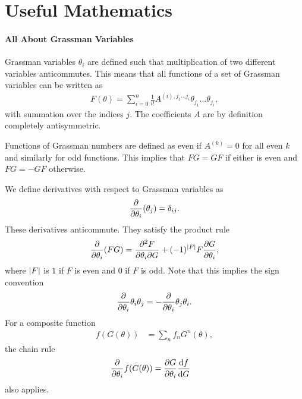 \section{Useful Mathematics}

\paragraph{All About Grassman Variables}
Grassman variables $\theta_{i}$ are defined such that multiplication of two different variables anticommutes. This means that all functions of a set of Grassman variables can be written as
\begin{align*}
	F(\theta) = \sum\limits_{i = 0}^{n}\frac{1}{i!}A^{(i), j_{1}\dots j_{i}}\theta_{j_{1}}\dots\theta_{j_{i}},
\end{align*}
with summation over the indices $j$. The coefficients $A$ are by definition completely antisymmetric.

Functions of Grassman numbers are defined as even if $A^{(k)} = 0$ for all even $k$ and similarly for odd functions. This implies that $FG = GF$ if either is even and $FG = -GF$ otherwise.

We define derivatives with respect to Grassman variables as
\begin{align*}
\pdv{\theta_{i}}(\theta_{j}) = \delta_{ij}.
\end{align*}
These derivatives anticommute. They satisfy the product rule
\begin{align*}
\pdv{\theta_{i}}(FG) = \pdv{F}{\theta_{i}}{G} + (-1)^{\abs{F}}F\pdv{G}{\theta_{i}},
\end{align*}
where $\abs{F}$ is $1$ if $F$ is even and $0$ if $F$ is odd. Note that this implies the sign convention
\begin{align*}
\pdv{\theta_{i}}\theta_{i}\theta_{j} = -\pdv{\theta_{i}}\theta_{j}\theta_{i}.
\end{align*}
For a composite function
\begin{align*}
f(G(\theta)) &= \sum\limits_{n}f_{n}G^{n}(\theta),
\end{align*}
the chain rule
\begin{align*}
\pdv{\theta_{i}} f(G(\theta)) &= \pdv{G}{\theta_{i}}\dv{f}{G}
\end{align*}
also applies.

